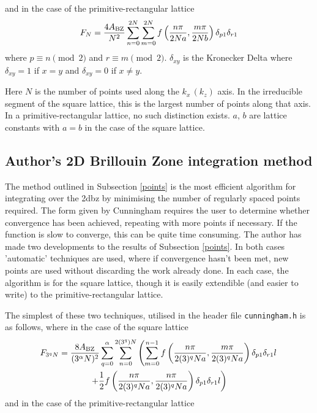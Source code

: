 \documentclass[a4paper, 12pt]{article}
\begin{document}
	and in the case of the primitive-rectangular lattice
	\begin{equation}\label{CPrectangle}
		F_N =\frac{4A_{\rm BZ}}{N^2}\sum_{n=0}^{2N}\sum_{m=0}^{2N} f\left(\frac{n\pi}{2Na}, \frac{m\pi}{2Nb}\right)\delta_{p 1}\delta_{r 1}
	\end{equation}
	where $p \equiv n\pmod 2$ and $r \equiv m\pmod 2$. $\delta_{x y}$ is the Kronecker Delta where $\delta_{x y} = 1$ if $x=y$ and $\delta_{x y} = 0$ if $x\neq y$.
	\\\par Here $N$ is the number of points used along the $k_x\,(k_z)$ axis. In the irreducible segment of the square lattice, this is the largest number of points along that axis. In a primitive-rectangular lattice, no such distinction exists. $a,\,b$ are lattice constants with $a=b$ in the case of the square lattice.

	\subsection{Author's 2D Brillouin Zone integration method}
	\qquad The method outlined in Subsection \ref{points} is the most efficient algorithm for integrating over the \gls{2dbz} by minimising the number of regularly spaced points required. The form given by Cunningham requires the user to determine whether convergence has been achieved, repeating with more points if necessary. If the function is slow to converge, this can be quite time consuming. 
	The author has made two developments to the results of Subsection \ref{points}. In both cases 'automatic' techniques are used, where if convergence hasn't been met, new points are used without discarding the work already done. In each case, the algorithm is for the square lattice, though it is easily extendible (and easier to write) to the primitive-rectangular lattice. 
	\\\par The simplest of these two techniques, utilised in the header file {\tt cunningham.h} is as follows, 
	where in the case of the square lattice
\begin{multline}\label{auto_square}
		F_{3^qN} =\frac{8A_{\rm BZ}}{(3^\alpha N)^2}\sum_{q=0}^\alpha\sum_{n=0}^{2(3^q)N}\left(\sum_{m=0}^{n-1} f\left(\frac{n\pi}{2(3)^qNa}, \frac{m\pi}{2(3)^qNa}\right)\delta_{p 1}\delta_{r 1}l\right.\\\left.+\frac{1}{2}f\left(\frac{n\pi}{2(3)^qNa}, \frac{n\pi}{2(3)^qNa}\right)\delta_{p 1}\delta_{r 1}l\right)
	\end{multline}
	and in the case of the primitive-rectangular lattice
\end{document}
